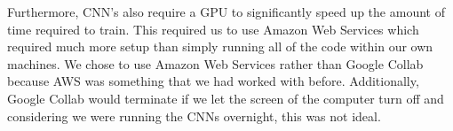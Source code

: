 \documentclass[letterpaper, 10 pt, conference]{ieeeconf}  %
\begin{document}
Furthermore, CNN's also require a GPU to significantly speed up the amount of time required to train. This required us to use Amazon Web Services which required much more setup than simply running all of the code within our own machines. We chose to use Amazon Web Services rather than Google Collab because AWS was something that we had worked with before. Additionally, Google Collab would terminate if we let the screen of the computer turn off and considering we were running the CNNs overnight, this was not ideal. 
\addtolength{\textheight}{-12cm}   %







\end{document}
